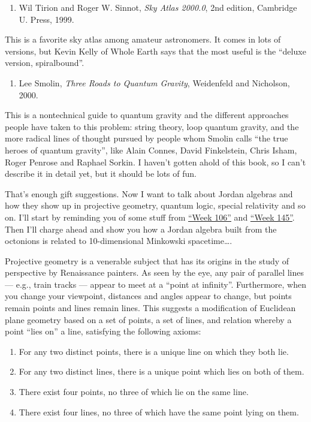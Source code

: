 \documentclass{article}
\def\tightlist{}
\begin{document}
\begin{enumerate}
\def\labelenumi{\arabic{enumi})}
\setcounter{enumi}{1}
\tightlist
\item
  Wil Tirion and Roger W. Sinnot, \emph{Sky Atlas 2000.0}, 2nd edition,
  Cambridge U. Press, 1999.
\end{enumerate}

This is a favorite sky atlas among amateur astronomers. It comes in lots
of versions, but Kevin Kelly of Whole Earth says that the most useful is
the ``deluxe version, spiralbound''.

\begin{enumerate}
\def\labelenumi{\arabic{enumi})}
\setcounter{enumi}{2}
\tightlist
\item
  Lee Smolin, \emph{Three Roads to Quantum Gravity}, Weidenfeld and
  Nicholson, 2000.
\end{enumerate}

This is a nontechnical guide to quantum gravity and the different
approaches people have taken to this problem: string theory, loop
quantum gravity, and the more radical lines of thought pursued by people
whom Smolin calls ``the true heroes of quantum gravity'', like Alain
Connes, David Finkelstein, Chris Isham, Roger Penrose and Raphael
Sorkin. I haven't gotten ahold of this book, so I can't describe it in
detail yet, but it should be lots of fun.

That's enough gift suggestions. Now I want to talk about Jordan algebras
and how they show up in projective geometry, quantum logic, special
relativity and so on. I'll start by reminding you of some stuff from
\protect\hyperlink{week106}{``Week 106''} and
\protect\hyperlink{week145}{``Week 145''}. Then I'll charge ahead and
show you how a Jordan algebra built from the octonions is related to
10-dimensional Minkowski spacetime\ldots.

Projective geometry is a venerable subject that has its origins in the
study of perspective by Renaissance painters. As seen by the eye, any
pair of parallel lines --- e.g., train tracks --- appear to meet at a
``point at infinity''. Furthermore, when you change your viewpoint,
distances and angles appear to change, but points remain points and
lines remain lines. This suggests a modification of Euclidean plane
geometry based on a set of points, a set of lines, and relation whereby
a point ``lies on'' a line, satisfying the following axioms:

\begin{enumerate}
\def\labelenumi{\Alph{enumi})}
\item
  For any two distinct points, there is a unique line on which they both
  lie.
\item
  For any two distinct lines, there is a unique point which lies on both
  of them.
\item
  There exist four points, no three of which lie on the same line.
\item
  There exist four lines, no three of which have the same point lying on
  them.
\end{enumerate}
\end{document}

